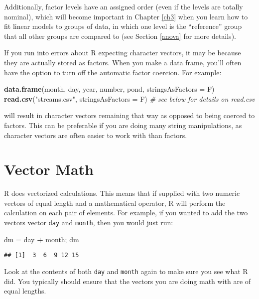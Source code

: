 \documentclass[]{book}
\newenvironment{Shaded}{\begin{snugshade}}{\end{snugshade}}
\newcommand{\KeywordTok}[1]{\textcolor[rgb]{0.13,0.29,0.53}{\textbf{#1}}}
\newcommand{\DataTypeTok}[1]{\textcolor[rgb]{0.13,0.29,0.53}{#1}}
\newcommand{\StringTok}[1]{\textcolor[rgb]{0.31,0.60,0.02}{#1}}
\newcommand{\CommentTok}[1]{\textcolor[rgb]{0.56,0.35,0.01}{\textit{#1}}}
\newcommand{\OperatorTok}[1]{\textcolor[rgb]{0.81,0.36,0.00}{\textbf{#1}}}
\newcommand{\NormalTok}[1]{#1}
\theoremstyle{definition}
\theoremstyle{definition}
\theoremstyle{definition}
\theoremstyle{remark}
\begin{document}
Additionally, factor levels have an assigned order (even if the levels
are totally nominal), which will become important in Chapter \ref{ch3}
when you learn how to fit linear models to groups of data, in which one
level is the ``reference'' group that all other groups are compared to
(see Section \ref{anova} for more details).

If you run into errors about R expecting character vectors, it may be
because they are actually stored as factors. When you make a data frame,
you'll often have the option to turn off the automatic factor coercion.
For example:

\begin{Shaded}
\begin{Highlighting}[]
\KeywordTok{data.frame}\NormalTok{(month, day, year, number, pond, }\DataTypeTok{stringsAsFactors =}\NormalTok{ F)}
\KeywordTok{read.csv}\NormalTok{(}\StringTok{"streams.csv"}\NormalTok{, }\DataTypeTok{stringsAsFactors =}\NormalTok{ F)  }\CommentTok{# see below for details on read.csv}
\end{Highlighting}
\end{Shaded}

will result in character vectors remaining that way as opposed to being
coerced to factors. This can be preferable if you are doing many string
manipulations, as character vectors are often easier to work with than
factors.

\section{Vector Math}\label{vector-math}

R does vectorized calculations. This means that if supplied with two
numeric vectors of equal length and a mathematical operator, R will
perform the calculation on each pair of elements. For example, if you
wanted to add the two vectors vector \texttt{day} and \texttt{month},
then you would just run:

\begin{Shaded}
\begin{Highlighting}[]
\NormalTok{dm =}\StringTok{ }\NormalTok{day }\OperatorTok{+}\StringTok{ }\NormalTok{month; dm}
\end{Highlighting}
\end{Shaded}

\begin{verbatim}
## [1]  3  6  9 12 15
\end{verbatim}

Look at the contents of both \texttt{day} and \texttt{month} again to
make sure you see what R did. You typically should ensure that the
vectors you are doing math with are of equal lengths.
\end{document}
